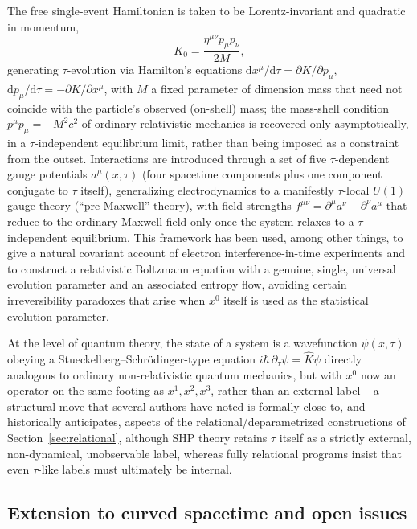 \documentclass[11pt]{article}
\newcommand{\dd}{\mathrm{d}}
\newcommand{\pd}{\partial}
\newcommand{\Op}[1]{\hat{#1}}
\begin{document}
The free single-event Hamiltonian is taken to be Lorentz-invariant and quadratic in momentum,
\begin{equation}
K_0 = \frac{\eta^{\mu\nu}p_\mu p_\nu}{2M},
\end{equation}
generating $\tau$-evolution via Hamilton's equations $\dd x^\mu/\dd\tau = \pd K/\pd p_\mu$, $\dd p_\mu/\dd\tau = -\pd K/\pd x^\mu$, with $M$ a fixed parameter of dimension mass that need not coincide with the particle's observed (on-shell) mass; the mass-shell condition $p^\mu p_\mu = -M^2c^2$ of ordinary relativistic mechanics is recovered only asymptotically, in a $\tau$-independent equilibrium limit, rather than being imposed as a constraint from the outset. Interactions are introduced through a set of five $\tau$-dependent gauge potentials $a^\mu(x,\tau)$ (four spacetime components plus one component conjugate to $\tau$ itself), generalizing electrodynamics to a manifestly $\tau$-local $U(1)$ gauge theory (``pre-Maxwell'' theory), with field strengths $f^{\mu\nu}=\pd^\mu a^\nu - \pd^\nu a^\mu$ that reduce to the ordinary Maxwell field only once the system relaxes to a $\tau$-independent equilibrium. This framework has been used, among other things, to give a natural covariant account of electron interference-in-time experiments and to construct a relativistic Boltzmann equation with a genuine, single, universal evolution parameter and an associated entropy flow, avoiding certain irreversibility paradoxes that arise when $x^0$ itself is used as the statistical evolution parameter.

At the level of quantum theory, the state of a system is a wavefunction $\psi(x,\tau)$ obeying a Stueckelberg--Schr\"odinger-type equation $i\hbar\,\pd_\tau\psi = \Op{K}\psi$ directly analogous to ordinary non-relativistic quantum mechanics, but with $x^0$ now an operator on the same footing as $x^1,x^2,x^3$, rather than an external label -- a structural move that several authors have noted is formally close to, and historically anticipates, aspects of the relational/deparametrized constructions of Section~\ref{sec:relational}, although SHP theory retains $\tau$ itself as a strictly external, non-dynamical, unobservable label, whereas fully relational programs insist that even $\tau$-like labels must ultimately be internal.

\subsection{Extension to curved spacetime and open issues}
\end{document}
